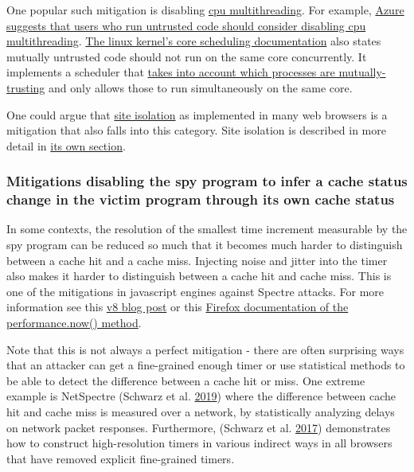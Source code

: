 \documentclass[a4paper,]{report}
\begin{document}
One popular such mitigation is disabling
\href{https://en.wikipedia.org/wiki/Multithreading_(computer_architecture)}{cpu
multithreading}. For example,
\href{https://learn.microsoft.com/en-us/azure/virtual-machines/mitigate-se}{Azure
suggests that users who run untrusted code should consider disabling cpu
multithreading}.
\href{https://www.kernel.org/doc/Documentation/admin-guide/hw-vuln/core-scheduling.rst}{The
linux kernel's core scheduling documentation} also states mutually
untrusted code should not run on the same core concurrently. It
implements a scheduler that
\href{https://lwn.net/Articles/861251/}{takes into account which
processes are mutually-trusting} and only allows those to run
simultaneously on the same core.

One could argue that
\href{https://developer.chrome.com/blog/site-isolation/}{site
isolation} as implemented in many web browsers is a mitigation that also
falls into this category. Site isolation is described in more detail in
\protect\hyperlink{site-isolation}{its own section}.

\hypertarget{mitigations-disabling-the-spy-program-to-infer-a-cache-status-change-in-the-victim-program-through-its-own-cache-status}{%
\subsubsection{Mitigations disabling the spy program to infer a cache
status change in the victim program through its own cache
status}\label{mitigations-disabling-the-spy-program-to-infer-a-cache-status-change-in-the-victim-program-through-its-own-cache-status}}

In some contexts, the resolution of the smallest time increment
measurable by the spy program can be reduced so much that it becomes
much harder to distinguish between a cache hit and a cache miss.
Injecting noise and jitter into the timer also makes it harder to
distinguish between a cache hit and cache miss. This is one of the
mitigations in javascript engines against Spectre attacks. For more
information see this \href{https://v8.dev/blog/spectre}{v8 blog post} or
this
\href{https://developer.mozilla.org/en-US/docs/Web/API/Performance/now}{Firefox
documentation of the performance.now() method}.

Note that this is not always a perfect mitigation - there are often
surprising ways that an attacker can get a fine-grained enough timer or
use statistical methods to be able to detect the difference between a
cache hit or miss. One extreme example is NetSpectre
(Schwarz et al. \protect\hyperlink{ref-Schwarz2019}{2019}) where the
difference between cache hit and cache miss is measured over a network,
by statistically analyzing delays on network packet responses.
Furthermore, (Schwarz et al. \protect\hyperlink{ref-Schwarz2017}{2017})
demonstrates how to construct high-resolution timers in various indirect
ways in all browsers that have removed explicit fine-grained timers.
\end{document}

